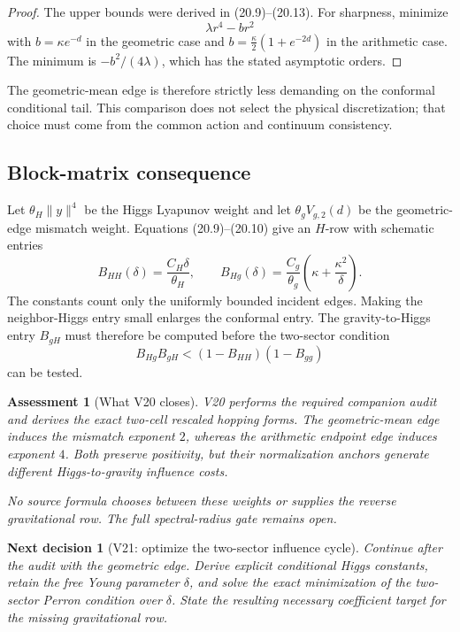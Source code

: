 \documentclass[11pt]{article}
\newtheorem{decision}[theorem]{Next decision}
\newtheorem{assessment}[theorem]{Assessment}
\theoremstyle{remark}
\begin{document}
\begin{proof}
The upper bounds were derived in (20.9)--(20.13).  For sharpness,
minimize
\[
 \lambda r^4-br^2
\]
with \(b=\kappa e^{-d}\) in the geometric case and
\(b=\frac\kappa2(1+e^{-2d})\) in the arithmetic case.  The minimum
is \(-b^2/(4\lambda)\), which has the stated asymptotic orders.
\end{proof}

The geometric-mean edge is therefore strictly less demanding on
the conformal conditional tail.  This comparison does not select
the physical discretization; that choice must come from the common
action and continuum consistency.

\subsection{Block-matrix consequence}

Let \(\theta_H\|y\|^4\) be the Higgs Lyapunov weight and let
\(\theta_gV_{g,2}(d)\) be the geometric-edge mismatch weight.
Equations (20.9)--(20.10) give an \(H\)-row with schematic entries
\[
 B_{HH}(\delta)
 =\frac{C_H\delta}{\theta_H},\qquad
 B_{Hg}(\delta)
 =\frac{C_g}{\theta_g}
 \left(\kappa+\frac{\kappa^2}{\delta}\right).       \tag{20.14}
\]
The constants count only the uniformly bounded incident edges.
Making the neighbor-Higgs entry small enlarges the conformal entry.
The gravity-to-Higgs entry \(B_{gH}\) must therefore be computed
before the two-sector condition
\[
 B_{Hg}B_{gH}
 <(1-B_{HH})(1-B_{gg})                             \tag{20.15}
\]
can be tested.

\begin{assessment}[What V20 closes]
\label{ass:v17v20-status}
V20 performs the required companion audit and derives the exact
two-cell rescaled hopping forms.  The geometric-mean edge induces
the mismatch exponent \(2\), whereas the arithmetic endpoint edge
induces exponent \(4\).  Both preserve positivity, but their
normalization anchors generate different Higgs-to-gravity
influence costs.

No source formula chooses between these weights or supplies the
reverse gravitational row.  The full spectral-radius gate remains
open.
\end{assessment}

\begin{decision}[V21: optimize the two-sector influence cycle]
\label{dec:v17v20-next}
Continue after the audit with the geometric edge.  Derive explicit
conditional Higgs constants, retain the free Young parameter
\(\delta\), and solve the exact minimization of the two-sector
Perron condition over \(\delta\).  State the resulting necessary
coefficient target for the missing gravitational row.
\end{decision}
\end{document}
